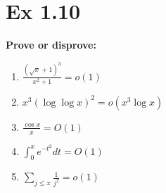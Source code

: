 \section*{Ex 1.10}
\begin{mdframed}
	\textbf{Prove or disprove:}
	\begin{enumerate}
        \item $\frac{(\sqrt x + 1)^3}{x^2 +1} = o(1)$
        \item $x^3(\log \log x)^2 = o(x^3\log x)$
        \item $\frac{\cos x}{x} = O(1)$
        \item $\int_0^xe^{-t^2}dt=O(1)$
        \item $\sum_{j\le x}\frac{1}{j^2}=o(1)$
    \end{enumerate}
\end{mdframed}

